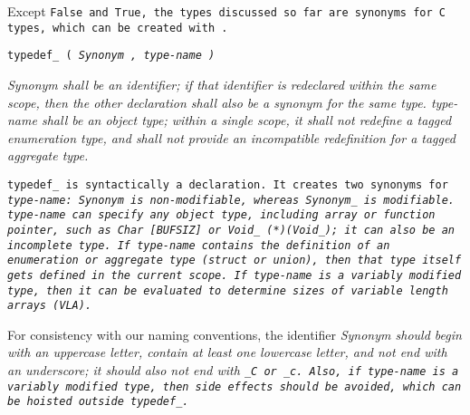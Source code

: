 Except \tt{False} and \tt{True}, the types discussed so far are
synonyms for C types, which can be created with .


\tt{typedef\_ (} \it{Synonym} \tt{,} \it{type-name} \tt{)}


\it{Synonym} shall be an identifier;
if that identifier is redeclared within the same scope,
then the other declaration shall also be a synonym for the same type.
\it{type-name} shall be an object type;
within a single scope, it shall not redefine a tagged enumeration type,
and shall not provide an incompatible redefinition for a tagged aggregate type.


\tt{typedef_} is syntactically a declaration.
It creates two synonyms for \it{type-name}:
\tt{Synonym} is non-modifiable, whereas \tt{Synonym_} is modifiable.
\it{type-name} can specify any object type, including array or function pointer,
such as \tt{Char [BUFSIZ]} or \tt{Void_ (*)(Void_)};
it can also be an incomplete type.
If \it{type-name} contains the definition of an
enumeration or aggregate type (\tt{struct} or \tt{union}),
then that type itself gets defined in the current scope.
If \it{type-name} is a variably modified type, then it can be evaluated
to determine sizes of variable length arrays (VLA).


For consistency with our naming conventions, the identifier \it{Synonym} should
begin with an uppercase letter, contain at least one lowercase letter, and
not end with an underscore; it should also not end with \tt{_C} or \tt{_c}.
Also, if \it{type-name} is a variably modified type,
then side effects should be avoided, which can be hoisted outside \tt{typedef_}.
